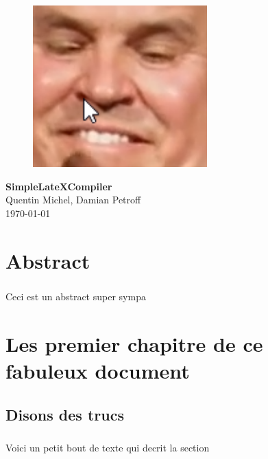 \documentclass[a4paper,10pt,openany,oneside]{report}
\begin{document}

\thispagestyle{empty}
\begin{figure}
	\centering
	\vspace*{1cm}
	\includegraphics[width=0.6\textwidth]{img/example.png}
\end{figure}
\vspace*{3cm}
\begin{center}
\textbf{\Huge{SimpleLateXCompiler}} \\[1cm]
{\Large Quentin Michel, Damian Petroff} \\[5cm]
\today
\end{center}

\chapter*{Abstract}
\paragraph{}Ceci est un abstract super sympa
\pagebreak

\tableofcontents
\pagebreak
\setcounter{page}{0}


\chapter{Les premier chapitre de ce fabuleux document}

\section{Disons des trucs}
\paragraph{}
Voici un petit bout de texte qui decrit la section
\end{document}
